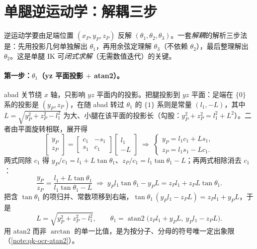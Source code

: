 \section{单腿逆运动学：解耦三步}
\label{sec:qk-ik}

逆运动学要由足端位置 $(x_P,y_P,z_P)$ 反解 $(\theta_1,\theta_2,\theta_3)$。一套\emph{解耦}的解析三步法是：先用投影几何单独解出 $\theta_1$，再用余弦定理解 $\theta_3$（不依赖 $\theta_2$），最后整理解出 $\theta_2$\cite{unitree2023quadruped}。这是单腿 IK 可\emph{闭式求解}（无需数值迭代）的关键。

\paragraph{第一步：$\theta_1$（yz 平面投影 $+$ atan2）。}
abad 关节绕 $x$ 轴，只影响 $yz$ 平面内的投影。把腿投影到 $yz$ 平面：足端在 $\{0\}$ 系的投影是 $(y_P,z_P)$，在随 abad 转过 $\theta_1$ 的 $\{1\}$ 系则是常量 $(l_1,-L)$，其中 $L=\sqrt{y_P^2+z_P^2-l_1^2}$ 为大、小腿在该平面的投影长（勾股：$y_P^2+z_P^2=l_1^2+L^2$）。二者由平面旋转相联，展开得\cite{unitree2023quadruped}
\begin{equation}
  \begin{bmatrix}y_P\\z_P\end{bmatrix}
  =\begin{bmatrix}c_1&-s_1\\ s_1&c_1\end{bmatrix}\begin{bmatrix}l_1\\ -L\end{bmatrix}
  \;\Longrightarrow\;
  \begin{cases} y_P=l_1 c_1+L s_1,\\[1pt] z_P=l_1 s_1-L c_1.\end{cases}
  \label{eq:qk-ik-th1-expand}
\end{equation}
两式同除 $c_1$ 得 $y_P/c_1=l_1+L\tan\theta_1$、$z_P/c_1=l_1\tan\theta_1-L$；再两式相除消去 $c_1$：
\[
  \frac{y_P}{z_P}=\frac{l_1+L\tan\theta_1}{l_1\tan\theta_1-L}
  \;\Longrightarrow\;
  y_P l_1\tan\theta_1-y_P L=z_P l_1+z_P L\tan\theta_1 .
\]
把含 $\tan\theta_1$ 的项归并、常数项移到右端，$\tan\theta_1\,(y_P l_1-z_P L)=z_P l_1+y_P L$，于是
\begin{equation}
  L=\sqrt{y_P^2+z_P^2-l_1^2},
  \qquad
  \theta_1=\operatorname{atan2}\!\big(z_P l_1+y_P L,\ y_P l_1-z_P L\big).
  \label{eq:qk-ik-theta1}
\end{equation}
用 atan2 而非 $\arctan$ 的单一比值，是为按分子、分母的符号唯一定出象限（\cref{note:qk-ocr-atan2}）。

